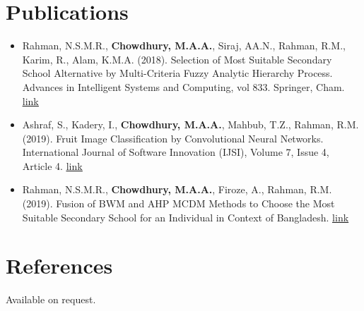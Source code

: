 \documentclass[11pt,a4paper]{article}
\begin{document}

\section{Publications}
 \begin{itemize}[leftmargin=0in, label={}]
    \item{
      Rahman, N.S.M.R., \textbf{Chowdhury, M.A.A.}, Siraj, AA.N., Rahman, R.M., Karim, R., Alam, K.M.A. (2018). Selection of Most Suitable Secondary School Alternative by Multi-Criteria Fuzzy Analytic Hierarchy Process. Advances in Intelligent Systems and Computing, vol 833. Springer, Cham. \href{https://link.springer.com/chapter/10.1007/978-3-319-98678-4_29}{\underline{link}}}
    \item{
      Ashraf, S., Kadery, I., \textbf{Chowdhury, M.A.A.}, Mahbub, T.Z., Rahman, R.M. (2019). Fruit Image Classification by Convolutional Neural Networks. International Journal of Software Innovation (IJSI), Volume 7, Issue 4, Article 4. \href{https://www.igi-global.com/gateway/article/236206}{\underline{link}}}
    \item{
      Rahman, N.S.M.R., \textbf{Chowdhury, M.A.A.}, Firoze, A., Rahman, R.M. (2019). Fusion of BWM and AHP MCDM Methods to Choose the Most Suitable Secondary School for an Individual in Context of Bangladesh. \href{https://link.springer.com/chapter/10.1007/978-3-319-98678-4_29}{\underline{link}} \\
    }
 \end{itemize}
 \vspace{-16pt}

\section{References}
Available on request.
\end{document}
